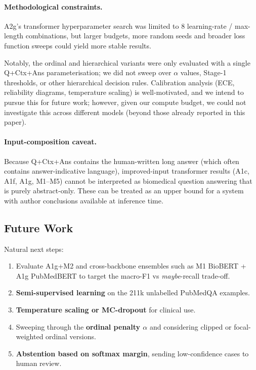 \documentclass[11pt]{article}
\begin{document}
\paragraph{Methodological constraints.} A2g's transformer hyperparameter search was limited to 8 learning-rate / max-length combinations, but larger budgets, more random seeds and broader loss function sweeps could yield more stable results.

Notably, the ordinal and hierarchical variants were only evaluated with a single Q+Ctx+Ans parameterisation; we did not sweep over $\alpha$ values, Stage-1 thresholds, or other hierarchical decision rules. Calibration analysis (ECE, reliability diagrams, temperature scaling) is well-motivated, and we intend to pursue this for future work; however, given our compute budget, we could not investigate this across different models (beyond those already reported in this paper).

\paragraph{Input-composition caveat.} Because Q+Ctx+Ans contains the human-written long answer (which often contains answer-indicative language), improved-input transformer results (A1c, A1f, A1g, M1--M5) cannot be interpreted as biomedical question answering that is purely abstract-only. These can be treated as an upper bound for a system with author conclusions available at inference time.

\subsection{Future Work}

Natural next steps:
\begin{enumerate}
\item Evaluate A1g+M2 and cross-backbone ensembles such as M1 BioBERT + A1g PubMedBERT to target the macro-F1 vs \textit{maybe}-recall trade-off.
\item \textbf{Semi-supervised learning} on the 211k unlabelled PubMedQA examples.
\item \textbf{Temperature scaling or MC-dropout} for clinical use.
\item Sweeping through the \textbf{ordinal penalty $\alpha$} and considering clipped or focal-weighted ordinal versions.
\item \textbf{Abstention based on softmax margin}, sending low-confidence cases to human review.
\end{enumerate}
\end{document}
